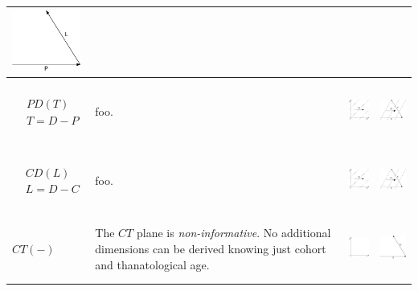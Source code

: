 \documentclass[
  12pt
]{scrartcl}
\begin{document}
\begin{center}
\begin{longtable}{m{}m{}m{}m{}}
  \includegraphics[height = 2cm]{../fig/LP_iso.pdf}  \\
  \midrule
  $$\begin{aligned}
    &PD(T) \\
    &T = D - P
  \end{aligned}$$ &
  foo. &
  \includegraphics[height = 2cm]{../fig/PDt.pdf} &
  \includegraphics[height = 2cm]{../fig/PDt_iso.pdf}  \\
  \midrule
  $$\begin{aligned}
    &CD(L) \\
    &L = D - C
  \end{aligned}$$ &
  foo. &
  \includegraphics[height = 2cm]{../fig/CDl.pdf} &
  \includegraphics[height = 2cm]{../fig/CDl_iso.pdf}  \\
  \midrule
  $CT(-)$ &
  The $CT$ plane is \emph{non-informative}. No additional dimensions can be derived knowing just cohort and thanatological age. &
  \includegraphics[height = 2cm]{../fig/CT.pdf} &
  \includegraphics[height = 2cm]{../fig/CT_iso.pdf}  \\

\end{longtable}
\end{center}
\end{document}
